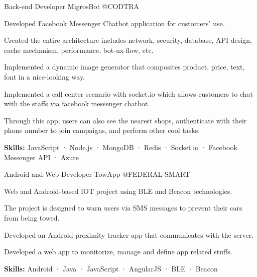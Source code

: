 \begin{cventries}
  \cventry
    {Back-end Developer} %
    {MigrosBot} %
    {@CODTRA} %
    {}
    {
      \begin{cvitems} %
        \item {Developed Facebook Messenger Chatbot application for customers' use.}
        \item {Created the entire architecture includes network, security, database, API design, cache mechanism, performance, bot-ux-flow, etc.}
        \item {Implemented a dynamic image generator that composites product, price, text, font in a nice-looking way.}
        \item {Implemented a call center scenario with socket.io which allows customers to chat with the staffs via facebook messenger chatbot.}
        \item {Through this app, users can also see the nearest shops, authenticate with their phone number to join campaigns, and perform other cool tasks.}
        \item {\textbf {Skills:} JavaScript · Node.js · MongoDB · Redis · Socket.io · Facebook Messenger API · Azure}
      \end{cvitems}
    }

  \cventry
    {Android and Web Developer} %
    {TowApp} %
    {@FEDERAL SMART} %
    {}
    {
      \begin{cvitems} %
        \item {Web and Android-based IOT project using BLE and Beacon technologies.}
        \item {The project is designed to warn users via SMS messages to prevent their cars from being towed.}
        \item {Developed an Android proximity tracker app that communicates with the server.}
        \item {Developed a web app to monitorize, manage and define app related stuffs.}
        \item {\textbf {Skills:} Android · Java · JavaScript · AngularJS · BLE · Beacon}
      \end{cvitems}
    }


\end{cventries}
